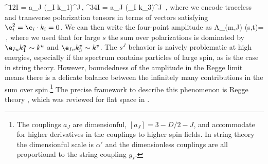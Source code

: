 	\beq
		  ^{12I} = a_J (\e_I \cdot k_1)^{J}\,, \qquad \qquad
		  ^{34I} = a_J (\e_I \cdot k_3)^{J}
		\,,
	\eeq
where we encode traceless and transverse polarization tensors in terms of
vectors satisfying $\e_i^2 =  \e_i \cdot k_i = 0$.
We can then   write the four-point amplitude as
	\beq
		 A_{(m,J)} (s,t)=  
		\approx
		   \,,
		\label{eq:A_spinning_flat}
	\eeq
where  we used that for large $s$ the sum over polarizations is dominated by $\e_{Iu} k_1^u \sim k^u$ and $\e_{Iv} k_3^v \sim k^v$.
The $s^J$ behavior is naively problematic at high energies, especially if the spectrum contains particles of large spin, as is the case in string theory. However, boundedness of the amplitude in the Regge limit means there is a delicate balance between the infinitely many contributions in the sum over spin.\footnote{The couplings $a_J$  are dimensionful,  $[a_J]= 3- D/2 -J$, and accommodate for higher derivatives in the couplings to higher spin fields. In string theory the dimensionful scale is $\alpha'$ and the dimensionless couplings are all proportional to the string coupling $g_s$.} The precise framework to describe this phenomenon is Regge theory \cite{Regge:1959mz}, which was reviewed for flat space in \cite{Costa:2012cb,Caron-Huot:2020nem}.

